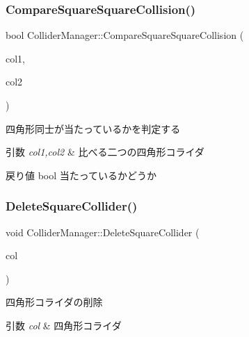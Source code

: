 \subsubsection{\texorpdfstring{Compare\+Square\+Square\+Collision()}{CompareSquareSquareCollision()}}
{\footnotesize\ttfamily bool Collider\+Manager\+::\+Compare\+Square\+Square\+Collision (\begin{DoxyParamCaption}\item[{const \mbox{\hyperlink{class_square_collider}{Square\+Collider}} $\ast$}]{col1,  }\item[{const \mbox{\hyperlink{class_square_collider}{Square\+Collider}} $\ast$}]{col2 }\end{DoxyParamCaption})\hspace{0.3cm}{\ttfamily [protected]}}



四角形同士が当たっているかを判定する 


\begin{DoxyParams}{引数}
{\em col1,col2} & 比べる二つの四角形コライダ \\
\hline
\end{DoxyParams}
\begin{DoxyReturn}{戻り値}
bool 当たっているかどうか 
\end{DoxyReturn}
\mbox{\label{class_collider_manager_a24df637a6f092602b547c6a2bd773113}} 
\subsubsection{\texorpdfstring{Delete\+Square\+Collider()}{DeleteSquareCollider()}}
{\footnotesize\ttfamily void Collider\+Manager\+::\+Delete\+Square\+Collider (\begin{DoxyParamCaption}\item[{\mbox{\hyperlink{class_square_collider}{Square\+Collider}} $\ast$}]{col }\end{DoxyParamCaption})}



四角形コライダの削除 


\begin{DoxyParams}{引数}
{\em col} & 四角形コライダ \\
\hline
\end{DoxyParams}
\mbox{\label{class_collider_manager_a9e6c7ca21ae4e79fdf4892982e72bc99}} 
